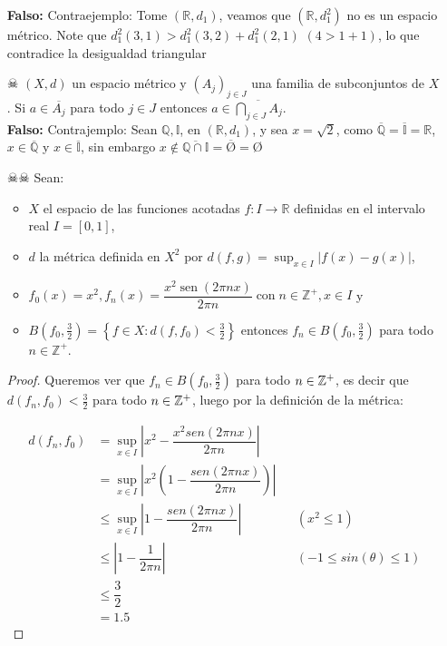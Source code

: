\begin{itemize}[leftmargin=*]
    \textbf{Falso: }Contraejemplo: Tome $(\mathbb{R},d_1)$, veamos que $(\mathbb{R},d_1^2)$ no es un espacio métrico. Note que $d_1^2(3,1)>d_1^2(3,2)+d_1^2(2,1)$ $(4>1+1)$, lo que contradice la desigualdad triangular
    
    \item[☠]$(X, d)$ un espacio métrico y $\left(A_j\right)_{j \in J}$ una familia de subconjuntos de $X$. Si $a \in \overline{A_j}$ para todo $j \in J$ entonces $a \in \overline{\bigcap_{j \in J} A_j}$.\\
    
    \textbf{Falso: }Contrajemplo: Sean $\mathbb{Q}, \mathbb{I}$, en $(\mathbb{R},d_1)$, y sea $x=\sqrt{2}$, como $\overline{\mathbb{Q}}=\overline{\mathbb{I}}=\mathbb{R}$, $x \in \overline{\mathbb{Q}}$ y $x\in \overline{\mathbb{I}}$, sin embargo $x\not \in \overline{\mathbb{Q}\cap \mathbb{I}}=\overline{\text{\O}}=$\O

    
    \item[☠☠] Sean:
    \begin{itemize}
        
\item $X$ el espacio de las funciones acotadas $f: I \rightarrow \mathbb{R}$ definidas en el intervalo real $I=[0,1]$,

\item $d$ la métrica definida en $X^2$ por $d(f, g)=\sup _{x \in I}|f(x)-g(x)|$,

\item $f_0(x)=x^2, f_n(x)=\dfrac{x^2 \operatorname{sen}(2 \pi n x)}{2 \pi n}                       
    \operatorname{con} n \in \mathbb{Z}^{+}, x \in I$ y

\item $B\left(f_0, \frac{3}{2}\right)=\left\{f \in X: d\left(f, f_0\right)<\frac{3}{2}\right\}$
entonces $f_n \in B\left(f_0, \frac{3}{2}\right)$ para todo $n \in \mathbb{Z}^{+}$.\\

    \end{itemize}
   
 \begin{proof}
    Queremos ver que $f_n\in B(f_0,\frac{3}{2})$ para todo $n \in \mathbb{Z}^+$, es decir que $d(f_n,f_0)<\frac{3}{2}$ para todo $n \in \mathbb{Z}^+$, luego por la definición de la métrica:
    
    \begin{align*}
        d(f_n,f_0)&=\sup_{x \in I}\left|x^2-\dfrac{x^2sen(2\pi nx)}{2\pi n}\right|\\
        &=\sup_{x \in I}\left|x^2\left(1-\dfrac{sen(2\pi nx)}{2\pi n}\right)\right|\\
        &\leq\sup_{x \in I}\left|1-\dfrac{sen(2\pi nx)}{2\pi n}\right| && (x^2\leq 1)\\
        &\leq\left|1-\dfrac{1}{2\pi n}\right|&&(-1\leq sin(\theta)\leq 1)\\
        &\leq \dfrac{3}{2}\\
        &=1.5
     \end{align*}


\end{proof}
\end{itemize}
